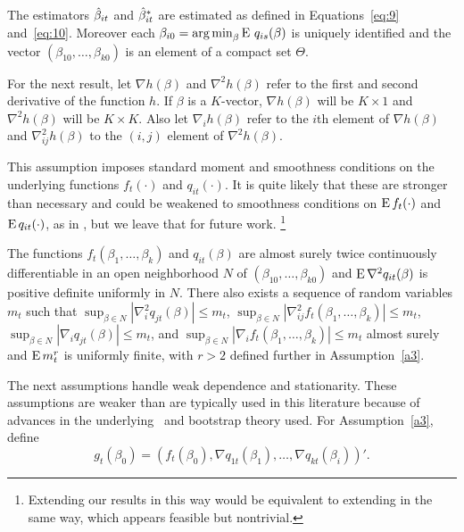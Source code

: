\documentclass[12pt,fleqn]{article}
\begin{document}
\begin{asmp}\label{a1}
  The estimators $\hat \beta_{it}$ and $\hat \beta_{it}^*$ are estimated as defined in
  Equations~\eqref{eq:9} and~\eqref{eq:10}. Moreover each $\beta_{i0} =
  \operatorname*{arg\,min}_\beta \operatorname{E}\, q_{is}(\beta)$ is uniquely identified and the vector
  $(\beta_{10},\dots,\beta_{k0})$ is an element of a compact set $\Theta$.
\end{asmp}

For the next result, let $\nabla h(\beta)$ and $\nabla^2 h(\beta)$
refer to the first and second derivative of the function $h$. If
$\beta$ is a $K$-vector, $\nabla h(\beta)$ will be $K \times 1$ and
$\nabla^2 h(\beta)$ will be $K \times K$. Also let $\nabla_i h(\beta)$
refer to the $i$th element of $\nabla h(\beta)$ and $\nabla_{ij}^2
h(\beta)$ to the $(i,j)$ element of $\nabla^2 h(\beta)$.

This assumption imposes standard moment and smoothness conditions on
the underlying functions $f_t(\cdot)$ and $q_{it}(\cdot)$. It is quite
likely that these are stronger than necessary and could be weakened to
smoothness conditions on $\operatorname{E} f_t(\cdot)$ and $\operatorname{E} q_{it}(\cdot)$, as in
\cite{Mcc:00}, but we leave that for future work.%
\footnote{Extending our results in this way would be equivalent to
  extending \cite{JoD:00} in the same way, which appears feasible but
  nontrivial.} %

\begin{asmp}\label{a2}
  The functions $f_t(\beta_1,\dots,\beta_k)$ and $q_{it}(\beta)$ are
  almost surely twice continuously differentiable in an open
  neighborhood $N$ of $(\beta_{10},\dots,\beta_{k0})$ and $\operatorname{E} \nabla^2
  q_{it}(\beta)$ is positive definite uniformly in $N$. There also
  exists a sequence of random variables $m_t$ such that
  $\sup_{\beta \in N} |\nabla_i^2 q_{jt}(\beta)| \leq m_t$,
  $\sup_{\beta \in N} |\nabla_{ij}^2 f_t(\beta_1,\dots,\beta_k)| \leq m_t$,
  $\sup_{\beta \in N} |\nabla_i q_{jt}(\beta)| \leq m_t$, and
  $\sup_{\beta \in N} |\nabla_i f_t(\beta_1,\dots,\beta_k)| \leq m_t$
  almost surely and $\operatorname{E} m_t^r$ is uniformly finite, with $r > 2$
  defined further in Assumption~\ref{a3}.
\end{asmp}

The next assumptions handle weak dependence and stationarity. These
assumptions are weaker than are typically used in this literature
because of advances in the underlying \clt\ and bootstrap theory used.
For Assumption~\ref{a3}, define
\[
  g_t(\beta_0) = (f_t(\beta_0), \nabla q_{1t}(\beta_1),\dots,\nabla q_{kt}(\beta_i))'.
\]
\end{document}
